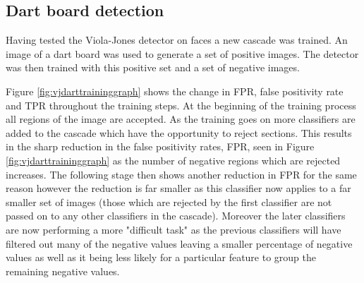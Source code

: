 \documentclass{article}
\begin{document}
\begin{multicols}{2}
\section{Dart board detection}

Having tested the Viola-Jones detector on faces a new cascade was trained. An
image of a dart board was used to generate a set of positive images. The
detector was then trained with this positive set and a set of negative images.

Figure \ref{fig:vjdarttraininggraph} shows the change in FPR, false positivity rate and TPR throughout
the training steps. At the beginning of the training process all regions of the
image are accepted. As the training goes on more classifiers are added to the
cascade which have the opportunity to reject sections. This results in the
sharp reduction in the false positivity rates, FPR, seen in
Figure \ref{fig:vjdarttraininggraph} as the number of negative regions which are
rejected increases. The following stage then shows another reduction in FPR for
the same reason however the reduction is far smaller as this classifier now
applies to a far smaller set of images (those which are rejected by the first
classifier are not passed on to any other classifiers in the cascade). Moreover
the later classifiers are now performing a more "difficult task" \cite{vj} as
the previous classifiers will have filtered out many of the negative values
leaving a smaller percentage of negative values as well as it being less likely
for a particular feature to group the remaining negative values.

\begin{center}
\end{center}
\end{multicols}
\end{document}
